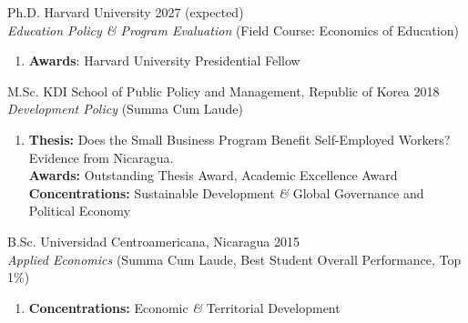 \documentclass[a4paper,10pt]{article}
\renewenvironment{itemize}{
  \begin{list}{}
    { \setlength{\itemsep}{5pt}
      \setlength{\parsep}{0pt}
      \setlength{\topsep}{0pt}
      \setlength{\leftmargin}{0em} } }{
  \end{list}}
\begin{document}
\begin{itemize}
\item Ph.D. Harvard University \hfill 2027 (expected) \\
{\small \textit{Education Policy \& Program Evaluation} (Field Course: Economics
of Education)}
  \begin{enumerate}[leftmargin=10pt, label={}, nosep]
    \item {\small \textbf{Awards}: Harvard University Presidential Fellow }
  \end{enumerate}

\item M.Sc. KDI School of Public Policy and Management, Republic of Korea \hfill 2018 \\
{\small \textit{Development Policy} (Summa Cum Laude)}
  
  \begin{enumerate}[leftmargin=10pt, label={}, nosep]
    \item {\small \textbf{Thesis:} Does the Small Business Program Benefit Self-Employed Workers? Evidence from Nicaragua. \\ 
    \textbf{Awards:} Outstanding Thesis Award, Academic Excellence Award \\ 
    \textbf{Concentrations:} Sustainable Development \textit{\&} Global Governance and Political Economy }
  \end{enumerate}
\item B.Sc. Universidad Centroamericana, Nicaragua \hfill 2015 \\
{\small \textit{Applied Economics} (Summa Cum Laude, Best Student Overall Performance, Top 1\%)}
  
  \begin{enumerate}[leftmargin=10pt, label={}, nosep]
    \item {\small \textbf{Concentrations:} Economic \textit{\&} Territorial Development}
  \end{enumerate}
\end{itemize}
\end{document}
